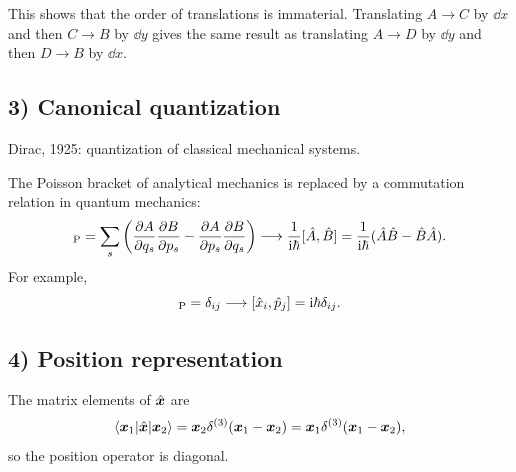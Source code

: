 This shows that the order of translations is immaterial. Translating $A\to C$ by $\dd x$ and then $C\to B$ by $\dd y$ gives the same result as translating $A\to D$ by $\dd y$ and then $D\to B$ by $\dd x$.
\begin{center}\end{center}
\subsection*{3) Canonical quantization}
Dirac, 1925: quantization of classical mechanical systems.

The Poisson bracket of analytical mechanics is replaced by a commutation relation in quantum mechanics:
\begin{equation}
[A,B]_{\rm P}=\sum_s\left(
\frac{\partial A}{\partial q_s}\frac{\partial B}{\partial p_s}
-\frac{\partial A}{\partial p_s}\frac{\partial B}{\partial q_s}
\right)
\longrightarrow\frac1{\ii\hbar}[\op A,\op B]
=\frac1{\ii\hbar}(\op A\op B-\op B\op A).
\end{equation}
For example,
\begin{equation}
[x_i,p_j]_{\rm P}=\delta_{ij}
\longrightarrow [\op x_i,\op p_j]=\ii\hbar\delta_{ij}.
\end{equation}
\subsection*{4) Position representation}
The matrix elements of $\hat{\bm{x}}$ are
\begin{equation}
\left\langle\bm{x}_1\middle|\hat{\bm{x}}\middle|\bm{x}_2\right\rangle
=\bm{x}_2\delta^{(3)}(\bm{x}_1-\bm{x}_2)
=\bm{x}_1\delta^{(3)}(\bm{x}_1-\bm{x}_2),
\end{equation}
so the position operator is diagonal.

